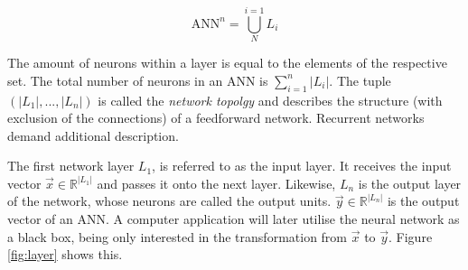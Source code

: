 \documentclass[10pt,a4paper,DIV=11]{scrreprt}
\begin{document}
\begin{equation}
    \text{ANN}^n = \bigcup_{N}^{i=1}{L_i}
\end{equation}

The amount of neurons within a layer is equal to the elements of the respective set. The total number of neurons in an ANN is 
$\sum_{i=1}^{n}{|L_i|}$. The tuple $(|L_1|,...,|L_n|)$ is called the \textit{network topolgy} and describes the 
structure (with exclusion of the connections) of a feedforward network. Recurrent networks demand additional description.

The first network layer $L_1$, is referred to as the input layer. It receives the input vector $\overrightarrow{x} \in \mathds{R}^{|L_1|}$ and 
passes it onto the next layer. Likewise, $L_n$ is the output layer of the network, whose neurons are called the output units. 
$\overrightarrow{y} \in \mathds{R}^{|L_n|}$ is the output vector of an ANN. A computer application will later utilise the neural network as a black 
box, being only interested in the transformation from $\overrightarrow{x}$ to $\overrightarrow{y}$. Figure \ref{fig:layer} shows this. 
\end{document}
